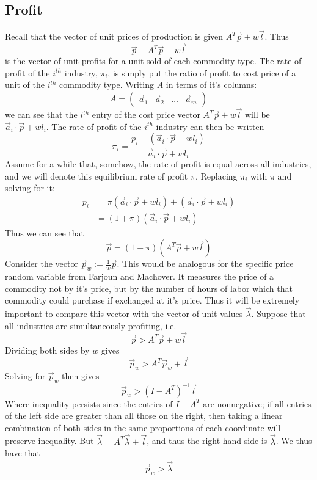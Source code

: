 \subsection{Profit}
Recall that the vector of unit prices of production is given $A^T\vec{p} + w\vec{l}$. Thus 
\[ \vec{p} - A^T\vec{p} - w\vec{l} \]
is the vector of unit profits for a unit sold of each commodity type. The rate of profit of the $i^{th}$ industry, $\pi_i$, is simply put the ratio of profit to cost price of a unit of the $i^{th}$ commodity type. Writing $A$ in terms of it's columns:
\[ A= \begin{pmatrix} \vec{a}_1 & \vec{a}_2 & \ldots & \vec{a}_m \end{pmatrix} \]
we can see that the $i^{th}$ entry of the cost price vector $A^T\vec{p}+w\vec{l}$ will be $\vec{a}_i \cdot \vec{p} + wl_i$. The rate of profit of the $i^{th}$ industry can then be written
\[ \pi_i = \frac{p_i - (\vec{a}_i \cdot \vec{p} + wl_i)}{\vec{a}_i \cdot \vec{p} + wl_i} \]
Assume for a while that, somehow, the rate of profit is equal across all industries, and we will denote this equilibrium rate of profit $\pi$. Replacing $\pi_i$ with $\pi$ and solving for it:
\begin{align*}
	  p_i &= \pi(\vec{a}_i \cdot \vec{p} + wl_i) + (\vec{a}_i \cdot \vec{p} + wl_i) \\
	 &= (1+\pi)(\vec{a}_i\cdot \vec{p} + wl_i)
\end{align*}
Thus we can see that
\[ \vec{p} = (1+\pi)(A^T\vec{p}+w\vec{l}) \]
Consider the vector $\vec{p}_w := \frac{1}{w}\vec{p}$. This would be analogous for the specific price random variable from Farjoun and Machover. It measures the price of a commodity not by it's price, but by the number of hours of labor which that commodity could purchase if exchanged at it's price. Thus it will be extremely important to compare this vector with the vector of unit values $\vec{\lambda}$. Suppose that all industries are simultaneously profiting, i.e. 
\[ \vec{p} > A^T\vec{p} + w\vec{l} \]
Dividing both sides by $w$ gives
\[ \vec{p}_w > A^T\vec{p}_w + \vec{l} \]
Solving for $\vec{p}_w$ then gives
\[ \vec{p}_w > (I-A^T)^{-1}\vec{l} \]
Where inequality persists since the entries of $I-A^T$ are nonnegative; if all entries of the left side are greater than all those on the right, then taking a linear combination of both sides in the same proportions of each coordinate will preserve inequality. But $\vec{\lambda} = A^T\vec{\lambda} + \vec{l}$, and thus the right hand side is $\vec{\lambda}$. We thus have that
\begin{align}
	\vec{p}_w > \vec{\lambda} \label{priceExceedsValue}
\end{align}
